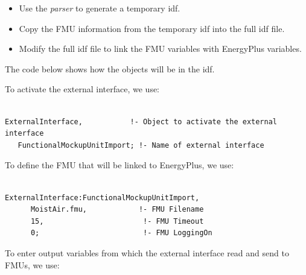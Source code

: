 \begin{itemize}
\item
  Use the \emph{parser} to generate a temporary idf.
\item
  Copy the FMU information from the temporary idf into the full idf file.
\item
  Modify the full idf file to link the FMU variables with EnergyPlus variables.
\end{itemize}

The code below shows how the objects will be in the idf.

To activate the external interface, we use:

\begin{lstlisting}

ExternalInterface,           !- Object to activate the external interface
   FunctionalMockupUnitImport; !- Name of external interface
\end{lstlisting}

To define the FMU that will be linked to EnergyPlus, we use:

\begin{lstlisting}

ExternalInterface:FunctionalMockupUnitImport,
      MoistAir.fmu,            !- FMU Filename
      15,                       !- FMU Timeout
      0;                        !- FMU LoggingOn
\end{lstlisting}

To enter output variables from which the external interface read and send to FMUs, we use:

